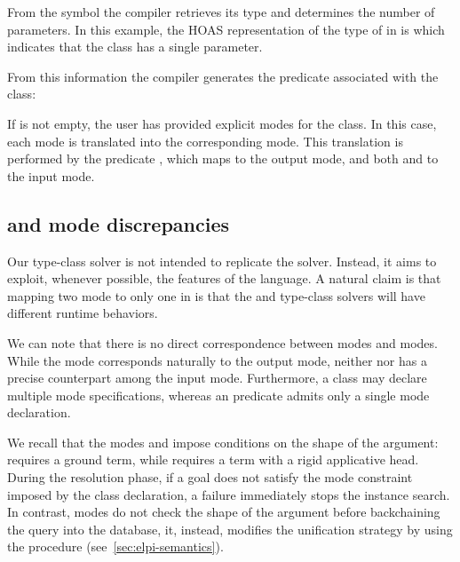 From the symbol  the compiler retrieves its type and determines the
number of parameters. In this example, the HOAS representation of the type of
 in \elpi is  which indicates that the class
has a single parameter.

From this information the compiler generates the predicate associated with the
class:

\begin{center}
\end{center}

If  is not empty, the user has provided explicit modes for the class. In
this case, each \rocq mode is translated into the corresponding \elpi mode.
This translation is performed by the predicate , which maps
\cI{-} to the \elpi output mode, and both \cI{+} and \cI{!} to the \elpi input
mode.

\subsection{\rocq and \elpi mode discrepancies}
\label{sec:tc-mode-and-determinacy}

Our type-class solver is not intended to replicate the \rocq solver. Instead, it
aims to exploit, whenever possible, the features of the \elpi language. A
natural claim is that mapping two \rocq mode to only one in \elpi is that the
\rocq and \elpi type-class solvers will have different runtime behaviors.

We can note that there is no direct correspondence between \rocq modes and
\elpi modes. While the \rocq mode \cI{-} corresponds naturally to the \elpi
output mode, neither \cI{+} nor \cI{!} has a precise counterpart among the
\elpi input mode. Furthermore, a \rocq class may declare multiple mode
specifications, whereas an \elpi predicate admits only a single mode
declaration.

We recall that the \rocq modes \cI{+} and \cI{!} impose conditions on the shape
of the argument: \cI{+} requires a ground term, while \cI{!} requires a term
with a rigid applicative head. During the resolution phase, if a goal does not
satisfy the mode constraint imposed by the class declaration, a failure
immediately stops the instance search. In contrast, \elpi modes do not check the
shape of the argument before backchaining the query into the database, it, instead,
modifies the unification strategy by using the \matching procedure
(see~\cref{sec:elpi-semantics}).

